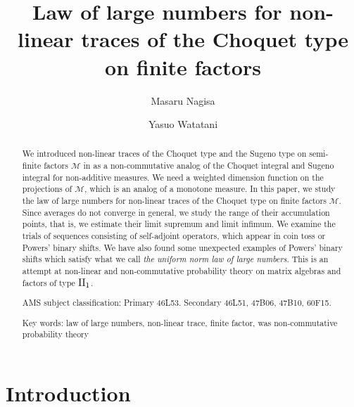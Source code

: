 \documentclass[a4paper,12pt]{amsart}
\newcommand{\M}{\mathcal{M}}
\begin{document}
\title[Law of large numbers for non-linear traces]{Law of large numbers for non-linear traces of the 
Choquet type on finite factors}

\author{Masaru Nagisa}
\address[Masaru Nagisa]{Department of Mathematics and Informatics, Faculty of Science, Chiba University, 
Chiba, 263-8522,  Japan: \ Department of Mathematical Sciences, Ritsumeikan University, Kusatsu, Shiga, 525-8577,  Japan}
\author{Yasuo Watatani}
\address[Yasuo Watatani]{Department of Mathematical Sciences,
Kyushu University, Motooka, Fukuoka, 819-0395, Japan}


\maketitle


\begin{abstract}
We introduced non-linear traces of the Choquet type and the Sugeno type on semi-finite factors $\M$ in \cite{nagisawatatani4}
as a non-commutative analog of the Choquet integral and Sugeno integral for non-additive measures. 
We need a weighted dimension function on the projections of $\M$, which is an analog of 
a monotone measure.  
In this paper, we study the law of large numbers for non-linear traces of the Choquet type on finite factors $\M$.   
Since averages do not converge in general, we study the range of their 
accumulation points, that is, we estimate their limit supremum and limit infimum.  We examine the trials of sequences 
consisting of 
self-adjoint operators, which appear in coin toss or Powers' binary shifts. We have also found some unexpected examples of Powers' binary shifts which satisfy what we call 
 {\it the uniform norm law of large numbers}. 
This is an attempt at non-linear and non-commutative probability theory on matrix algebras and factors of 
type ${\rm II}_1$. 

\medskip\par\noindent
AMS subject classification: Primary 46L53. Secondary 46L51, 47B06, 47B10, 60F15.

\medskip\par\noindent
Key words: law of large numbers, non-linear trace, finite factor, was
non-commutative probability theory

\end{abstract}

\section{Introduction}
\end{document}
